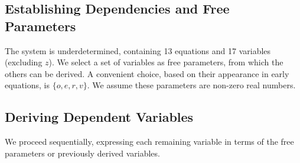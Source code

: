 \documentclass[12pt,a4paper]{article}
\theoremstyle{plain}
\theoremstyle{definition}
\begin{document}
\subsection{Establishing Dependencies and Free Parameters}
The system is underdetermined, containing 13 equations and 17 variables (excluding $z$). We select a set of variables as free parameters, from which the others can be derived. A convenient choice, based on their appearance in early equations, is $\{o, e, r, v\}$. We assume these parameters are non-zero real numbers.

\subsection{Deriving Dependent Variables}
We proceed sequentially, expressing each remaining variable in terms of the free parameters or previously derived variables.
\end{document}
